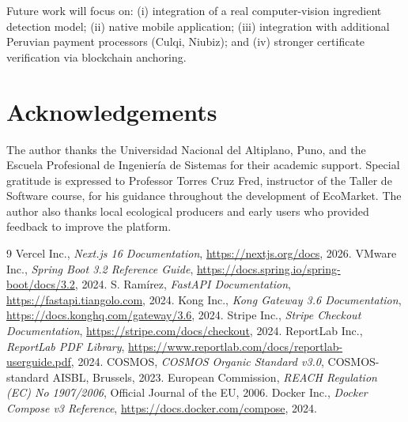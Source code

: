 \documentclass[10pt,a4paper,twocolumn]{article}
\begin{document}
Future work will focus on: (i) integration of a real
computer-vision ingredient detection model; (ii) native mobile
application; (iii) integration with additional Peruvian payment
processors (Culqi, Niubiz); and (iv) stronger certificate
verification via blockchain anchoring.

\section*{Acknowledgements}

The author thanks the Universidad Nacional del Altiplano, Puno, and the
Escuela Profesional de Ingeniería de Sistemas for their academic support.
Special gratitude is expressed to Professor Torres Cruz Fred, instructor
of the Taller de Software course, for his guidance throughout the
development of EcoMarket. The author also thanks local ecological
producers and early users who provided feedback to improve the platform.

\begin{thebibliography}{9}
 Vercel Inc., \textit{Next.js 16 Documentation},
  \url{https://nextjs.org/docs}, 2026.
 VMware Inc., \textit{Spring Boot 3.2 Reference Guide},
  \url{https://docs.spring.io/spring-boot/docs/3.2}, 2024.
 S. Ramírez, \textit{FastAPI Documentation},
  \url{https://fastapi.tiangolo.com}, 2024.
 Kong Inc., \textit{Kong Gateway 3.6 Documentation},
  \url{https://docs.konghq.com/gateway/3.6}, 2024.
 Stripe Inc., \textit{Stripe Checkout Documentation},
  \url{https://stripe.com/docs/checkout}, 2024.
 ReportLab Inc., \textit{ReportLab PDF Library},
  \url{https://www.reportlab.com/docs/reportlab-userguide.pdf}, 2024.
 COSMOS, \textit{COSMOS Organic Standard v3.0},
  COSMOS-standard AISBL, Brussels, 2023.
 European Commission, \textit{REACH Regulation
  (EC) No 1907/2006}, Official Journal of the EU, 2006.
 Docker Inc., \textit{Docker Compose v3 Reference},
  \url{https://docs.docker.com/compose}, 2024.
\end{thebibliography}
\end{document}
